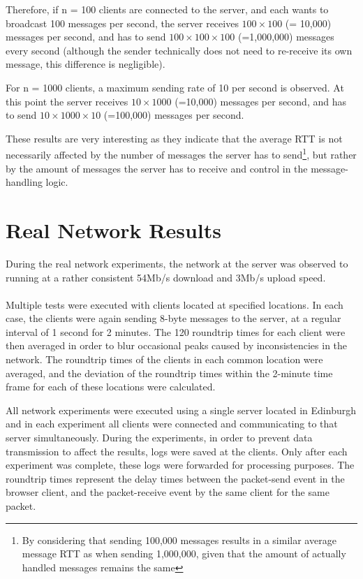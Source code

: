 \documentclass[bsc,frontabs,twoside,singlespacing,parskip,deptreport]{infthesis}     %
\begin{document}
Therefore, if n = 100 clients are connected to the server, and each wants to broadcast 100 messages per second, the server receives $100 \times 100$ (= 10,000) messages per second, and has to send $100 \times 100 \times 100$ (=1,000,000) messages every second (although the sender technically does not need to re-receive its own message, this difference is negligible).

For n = 1000 clients, a maximum sending rate of 10 per second is observed. At this point the server receives $10 \times 1000$ (=10,000) messages per second, and has to send $10 \times 1000 \times 10$ (=100,000) messages per second.

These results are very interesting as they indicate that the average RTT is not necessarily affected by the number of messages the server has to send\footnote{By considering that sending 100,000 messages results in a similar average message RTT as when sending 1,000,000, given that the amount of actually handled messages remains the same}, but rather by the amount of messages the server has to receive and control in the message-handling logic.


\section{Real Network Results}
During the real network experiments, the network at the server was observed to running at a rather consistent 54Mb/s download and 3Mb/s upload speed.

\paragraph*{}Multiple tests were executed with clients located at specified locations. In each case, the clients were again sending 8-byte messages to the server, at a regular interval of 1 second for 2 minutes. The 120 roundtrip times for each client were then averaged in order to blur occasional peaks caused by inconsistencies in the network. The roundtrip times of the clients in each common location were averaged, and the deviation of the roundtrip times within the 2-minute time frame for each of these locations were calculated.

All network experiments were executed using a single server located in Edinburgh and in each experiment all clients were connected and communicating to that server simultaneously. During the experiments, in order to prevent data transmission to affect the results, logs were saved at the clients. Only after each experiment was complete, these logs were forwarded for processing purposes. The roundtrip times represent the delay times between the packet-send event in the browser client, and the packet-receive event by the same client for the same packet.
\end{document}
